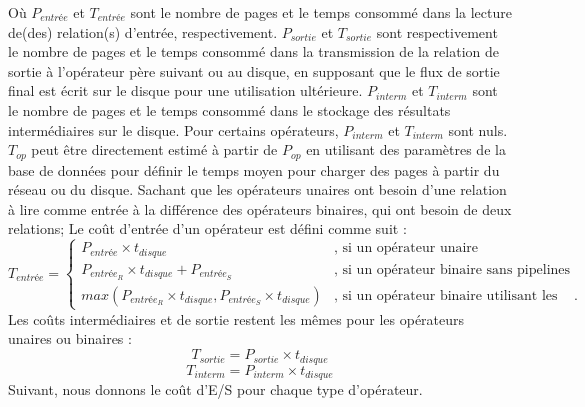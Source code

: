 Où $P_{entrée}$ et $T_{entrée}$ sont le nombre de pages et le temps consommé dans la lecture de(des) relation(s) d'entrée, respectivement. $P_{sortie}$ et $T_{sortie}$ sont respectivement le nombre de pages et le temps consommé dans la transmission de la relation de sortie à l'opérateur père suivant ou au disque, en supposant que le flux de sortie final est écrit sur le disque pour une utilisation ultérieure. $P_{interm}$ et $T_{interm}$ sont le nombre de pages et le temps consommé dans le stockage des résultats intermédiaires sur le disque. Pour certains opérateurs, $P_{interm}$ et $T_{interm}$ sont nuls. $T_{op}$ peut être directement estimé à partir de $P_{op}$ en utilisant des paramètres de la base de données pour définir le temps moyen pour charger des pages à partir du réseau ou du disque. Sachant que les opérateurs unaires ont besoin d'une relation à lire comme entrée à la différence des opérateurs binaires, qui ont besoin de deux relations; Le coût d'entrée d'un opérateur est défini comme suit :
\begin{equation}
  T_{entrée} = \begin{cases}
  P_{entrée} \times t_{disque} & \text{, si un opérateur unaire} \\
  P_{entrée_R} \times t_{disque} + P_{entrée_S} & \text{, si un opérateur binaire sans pipelines} \\
  max(P_{entrée_R} \times t_{disque}, P_{entrée_S} \times t_{disque}) & \text{, si un opérateur binaire utilisant les pipelines}.
\end{cases}
\end{equation}
Les coûts intermédiaires et de sortie restent les mêmes pour les opérateurs unaires ou binaires :
\begin{equation}
T_{sortie} = P_{sortie} \times t_{disque}
\end{equation}
\begin{equation}
T_{interm} = P_{interm} \times t_{disque}
\end{equation}
Suivant, nous donnons le coût d'E/S pour chaque type d'opérateur.

